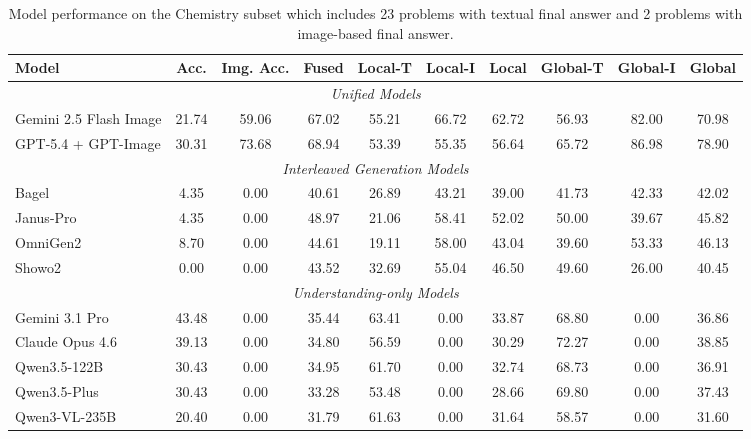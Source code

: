 \documentclass[11pt]{article}
\begin{document}
\begin{table}[t]
  \centering
  \small
  \begin{tabular}{lccccccccc}
    \toprule
    Model & Acc. & Img. Acc. & Fused & Local-T & Local-I & Local & Global-T & Global-I & Global \\
    \midrule
    \multicolumn{10}{c}{\textit{Unified Models}} \\
    \midrule
    Gemini 2.5 Flash Image & 21.74 & 59.06 & 67.02 & 55.21 & 66.72 & 62.72 & 56.93 & 82.00 & 70.98 \\
    GPT-5.4 + GPT-Image & 30.31 & 73.68 & 68.94 & 53.39 & 55.35 & 56.64 & 65.72 & 86.98 & 78.90 \\
    \midrule
    \multicolumn{10}{c}{\textit{Interleaved Generation Models}} \\
    \midrule
    Bagel & 4.35 & 0.00 & 40.61 & 26.89 & 43.21 & 39.00 & 41.73 & 42.33 & 42.02 \\
    Janus-Pro & 4.35 & 0.00 & 48.97 & 21.06 & 58.41 & 52.02 & 50.00 & 39.67 & 45.82 \\
    OmniGen2 & 8.70 & 0.00 & 44.61 & 19.11 & 58.00 & 43.04 & 39.60 & 53.33 & 46.13 \\
    Showo2 & 0.00 & 0.00 & 43.52 & 32.69 & 55.04 & 46.50 & 49.60 & 26.00 & 40.45 \\
    \midrule
    \multicolumn{10}{c}{\textit{Understanding-only Models}} \\
    \midrule
    Gemini 3.1 Pro & 43.48 & 0.00 & 35.44 & 63.41 & 0.00 & 33.87 & 68.80 & 0.00 & 36.86 \\
    Claude Opus 4.6 & 39.13 & 0.00 & 34.80 & 56.59 & 0.00 & 30.29 & 72.27 & 0.00 & 38.85 \\
    Qwen3.5-122B & 30.43 & 0.00 & 34.95 & 61.70 & 0.00 & 32.74 & 68.73 & 0.00 & 36.91 \\
    Qwen3.5-Plus & 30.43 & 0.00 & 33.28 & 53.48 & 0.00 & 28.66 & 69.80 & 0.00 & 37.43 \\
    Qwen3-VL-235B & 20.40 & 0.00 & 31.79 & 61.63 & 0.00 & 31.64 & 58.57 & 0.00 & 31.60 \\
    \bottomrule
  \end{tabular}
  \caption{Model performance on the Chemistry subset which includes 23 problems with textual final answer and 2 problems with image-based final answer.}
  \label{tab:domain_che_metrics}
\end{table}
\end{document}
